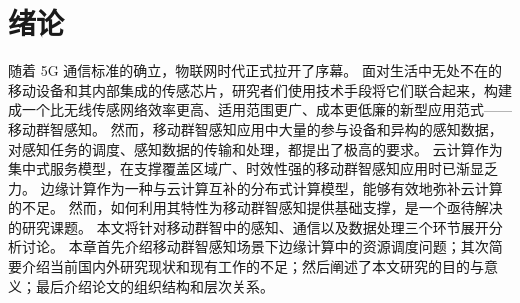 

\chapter{绪论}


随着 5G 通信标准的确立，物联网时代正式拉开了序幕。
面对生活中无处不在的移动设备和其内部集成的传感芯片，研究者们使用技术手段将它们联合起来，构建成一个比无线传感网络效率更高、适用范围更广、成本更低廉的新型应用范式——移动群智感知。
然而，移动群智感知应用中大量的参与设备和异构的感知数据，对感知任务的调度、感知数据的传输和处理，都提出了极高的要求。
云计算作为集中式服务模型，在支撑覆盖区域广、时效性强的移动群智感知应用时已渐显乏力。
边缘计算作为一种与云计算互补的分布式计算模型，能够有效地弥补云计算的不足。
然而，如何利用其特性为移动群智感知提供基础支撑，是一个亟待解决的研究课题。
本文将针对移动群智中的感知、通信以及数据处理三个环节展开分析讨论。
本章首先介绍移动群智感知场景下边缘计算中的资源调度问题；其次简要介绍当前国内外研究现状和现有工作的不足；然后阐述了本文研究的目的与意义；最后介绍论文的组织结构和层次关系。



